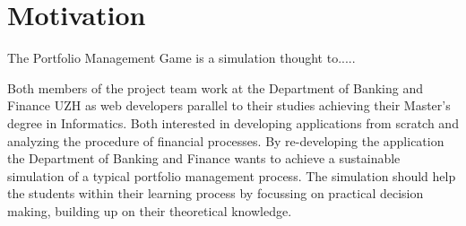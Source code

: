\section{Motivation}
The Portfolio Management Game is a simulation thought to.....

Both members of the project team work at the Department of Banking and Finance UZH as web developers parallel to their studies achieving their Master’s degree in Informatics. Both interested in developing applications from scratch and analyzing the procedure of financial processes. By re-developing the application the Department of Banking and Finance wants to achieve a sustainable simulation of a typical portfolio management process. The simulation should help the students within their learning process by focussing on practical decision making, building up on their theoretical knowledge.
